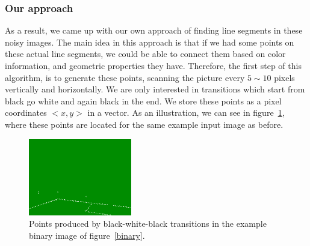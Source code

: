 \documentclass[	DIV=calc,%
							paper=a4,%
							fontsize=9pt,%
							twocolumn]{scrartcl}	 					%
\begin{document}
\subsubsection{Our approach}
As a result, we came up with our own approach of finding line segments in these noisy images. The main idea in this approach is that if we had some points on these actual line segments, we could be able to connect them based on color information, and geometric properties they have. Therefore, the first step of this algorithm, is to generate these points, scanning the picture every $5 \sim 10$ pixels vertically and horizontally. We are only interested in transitions which start from black go white and again black in the end. We store these points as a pixel coordinates $<x,y>$ in a vector. As an illustration, we can see in figure~\ref{points}, where these points are located for the same example input image as before.
\begin{figure}[t!]
\caption{Points produced by black-white-black transitions in the example binary image of figure~\ref{binary}.}
\label{points}
\centering    
\includegraphics[width=0.4\textwidth]{figures/points.png}
\end{figure}
\end{document}
